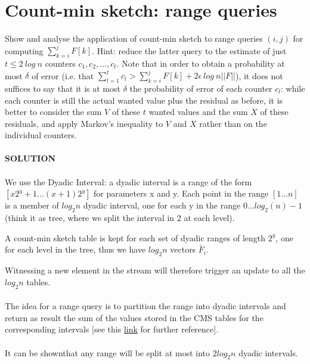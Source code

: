 \documentclass[a4paper]{article}
\begin{document}
\section*{Count-min sketch: range queries}
Show and analyse the application of count-min sketch to range queries $(i,j)$ for computing  $\sum^j_{k=i} F[k]$. Hint: reduce the latter query to the estimate of just $t \leq 2\ log\ n$ counters $c_1,c_2,...,c_t$. Note that in order to obtain a probability at most $\delta$ of error (i.e. that $\sum^t_{l=1}c_l > \sum^j_{k=i}F[k] + 2\epsilon\ log\ n ||F||$), it does not suffices to say that it is at most $\delta$ the probability of error of each counter $c_l$: while each counter is still the actual wanted value plus the residual as before, it is better to consider the sum $V$ of these $t$ wanted values and the sum $X$ of these residuals, and apply Markov's inequality to $V$ and $X$ rather than on the individual counters.
\\
\\
\textbf{SOLUTION}
\\
\\
We use the Dyadic Interval: a dyadic interval is a range of the form $[x2^y+1 . . .(x+1)2^y]$  for parameters x and y. Each point in the range $[1\dots n]$ is a member of $log_2 n$ dyadic interval, one for each y in the range $0\dots log_2(n) − 1$ (think it as tree, where we split the interval in 2 at each level).

A count-min sketch table is kept for each set of dyadic ranges of length $2^y$, one for each level in the tree, thus we have $log_2 n$ vectors $\widetilde{F_i}$.

Witnessing a new element in the stream will therefore trigger an update to all the $log_2 n$ tables.
\\
\\
The idea for a range query is to partition the range into dyadic intervals and return as result the sum of the values stored in the CMS tables for the corresponding intervals [see this \href{http://dimacs.rutgers.edu/~graham/pubs/papers/cm-full.pdf}{link} for further reference].
\\
\\
It can be shown\footnotemark that any range will be split at most into $2log_2 n$ dyadic intervals.

\end{document}
